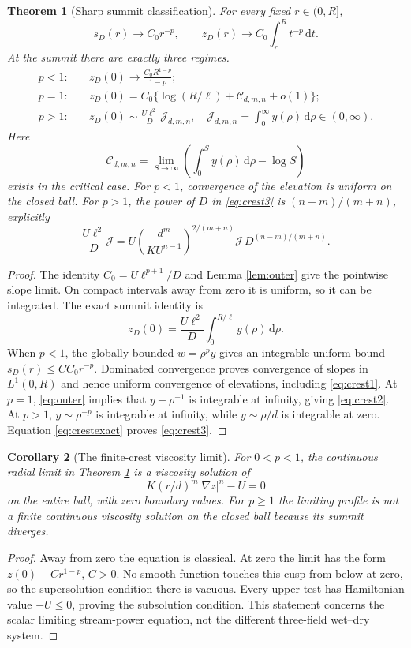 \documentclass[11pt,a4paper]{article}
\newtheorem{theorem}{Theorem}[section]
\newtheorem{corollary}[theorem]{Corollary}
\theoremstyle{definition}\newtheorem{definition}[theorem]{Definition}
\theoremstyle{remark}\newtheorem{remark}[theorem]{Remark}
\newcommand{\dd}{\,\mathrm d}
\begin{document}
\begin{theorem}[Sharp summit classification]\label{thm:crest}
For every fixed $r\in(0,R]$,
\[
 s_D(r)\longrightarrow C_0 r^{-p},\qquad
 z_D(r)\longrightarrow C_0\int_r^R t^{-p}\dd t.
\]
At the summit there are exactly three regimes.
\begin{align}
 p<1:\quad &z_D(0)\longrightarrow\frac{C_0R^{1-p}}{1-p};\label{eq:crest1}\\
 p=1:\quad &z_D(0)=C_0\{\log(R/\ell)+\mathcal C_{d,m,n}+o(1)\};\label{eq:crest2}\\
 p>1:\quad &z_D(0)\sim\frac{U\ell^2}{D}\,\mathcal J_{d,m,n},\quad
 \mathcal J_{d,m,n}=\int_0^\infty y(\rho)\dd\rho\in(0,\infty).\label{eq:crest3}
\end{align}
Here
\[
 \mathcal C_{d,m,n}=\lim_{S\to\infty}\left(\int_0^S y(\rho)\dd\rho-\log S\right)
\]
exists in the critical case. For $p<1$, convergence of the elevation is uniform on the closed ball. For $p>1$, the power of $D$ in \eqref{eq:crest3} is $(n-m)/(m+n)$, explicitly
\[
 \frac{U\ell^2}{D}\mathcal J
 =U\left(\frac{d^m}{KU^{n-1}}\right)^{2/(m+n)}
 \mathcal J\,D^{(n-m)/(m+n)}.
\]
\end{theorem}
\begin{proof}
The identity $C_0=U\ell^{p+1}/D$ and Lemma \ref{lem:outer} give the pointwise slope limit. On compact intervals away from zero it is uniform, so it can be integrated. The exact summit identity is
\begin{equation}
 z_D(0)=\frac{U\ell^2}{D}\int_0^{R/\ell}y(\rho)\dd\rho.\label{eq:crestexact}
\end{equation}
When $p<1$, the globally bounded $w=\rho^p y$ gives an integrable uniform bound $s_D(r)\leq C C_0r^{-p}$. Dominated convergence proves convergence of slopes in $L^1(0,R)$ and hence uniform convergence of elevations, including \eqref{eq:crest1}. At $p=1$, \eqref{eq:outer} implies that $y-\rho^{-1}$ is integrable at infinity, giving \eqref{eq:crest2}. At $p>1$, $y\sim\rho^{-p}$ is integrable at infinity, while $y\sim\rho/d$ is integrable at zero. Equation \eqref{eq:crestexact} proves \eqref{eq:crest3}.
\end{proof}

\begin{corollary}[The finite-crest viscosity limit]
For $0<p<1$, the continuous radial limit in Theorem \ref{thm:crest} is a viscosity solution of
\[
 K(r/d)^m|\nabla z|^n-U=0
\]
on the entire ball, with zero boundary values. For $p\geq1$ the limiting profile is not a finite continuous viscosity solution on the closed ball because its summit diverges.
\end{corollary}
\begin{proof}
Away from zero the equation is classical. At zero the limit has the form $z(0)-Cr^{1-p}$, $C>0$. No smooth function touches this cusp from below at zero, so the supersolution condition there is vacuous. Every upper test has Hamiltonian value $-U\leq0$, proving the subsolution condition. This statement concerns the scalar limiting stream-power equation, not the different three-field wet--dry system.
\end{proof}
\end{document}
